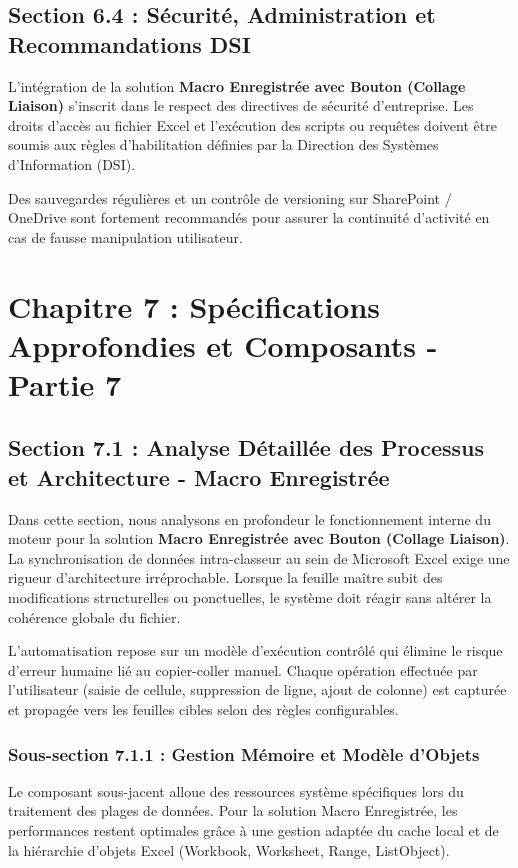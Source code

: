 \documentclass[12pt,a4paper]{report}
\begin{document}
\section{Section 6.4 : Sécurité, Administration et Recommandations DSI}
L'intégration de la solution \textbf{Macro Enregistrée avec Bouton (Collage Liaison)} s'inscrit dans le respect des directives de sécurité d'entreprise. Les droits d'accès au fichier Excel et l'exécution des scripts ou requêtes doivent être soumis aux règles d'habilitation définies par la Direction des Systèmes d'Information (DSI).

Des sauvegardes régulières et un contrôle de versioning sur SharePoint / OneDrive sont fortement recommandés pour assurer la continuité d'activité en cas de fausse manipulation utilisateur.


\chapter{Chapitre 7 : Spécifications Approfondies et Composants - Partie 7}

\section{Section 7.1 : Analyse Détaillée des Processus et Architecture - Macro Enregistrée}
Dans cette section, nous analysons en profondeur le fonctionnement interne du moteur pour la solution \textbf{Macro Enregistrée avec Bouton (Collage Liaison)}. La synchronisation de données intra-classeur au sein de Microsoft Excel exige une rigueur d'architecture irréprochable. Lorsque la feuille maître subit des modifications structurelles ou ponctuelles, le système doit réagir sans altérer la cohérence globale du fichier.

L'automatisation repose sur un modèle d'exécution contrôlé qui élimine le risque d'erreur humaine lié au copier-coller manuel. Chaque opération effectuée par l'utilisateur (saisie de cellule, suppression de ligne, ajout de colonne) est capturée et propagée vers les feuilles cibles selon des règles configurables.


\subsection{Sous-section 7.1.1 : Gestion Mémoire et Modèle d'Objets}
Le composant sous-jacent alloue des ressources système spécifiques lors du traitement des plages de données. Pour la solution Macro Enregistrée, les performances restent optimales grâce à une gestion adaptée du cache local et de la hiérarchie d'objets Excel (Workbook, Worksheet, Range, ListObject).
\end{document}
